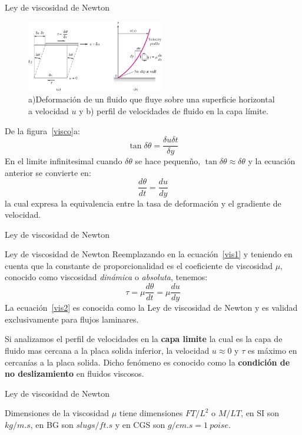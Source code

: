 \documentclass [xcolor=svgnames, t] {beamer}
\begin{document}
\begin{frame}{Ley de viscosidad de Newton}
\small
\vspace{-0.4cm}
\begin{figure}[h]
\centering
\includegraphics[width=6cm]{visco}
\caption{a)Deformaci\'on de un fluido que fluye sobre una superficie horizontal a velocidad $u$ y  b) perfil de velocidades de fluido en la capa l\'imite.}
\end{figure}
\vspace{-0.4cm}
De la figura~\ref{visco}a:
$$
\tan \delta \theta = \frac{\delta u \delta t}{\delta y}
$$
En el limite infinitesimal cuando $\delta \theta$ se hace pequen\~no, $\tan \delta \theta \approx \delta \theta$ y la ecuaci\'on anterior se convierte en:
$$
\frac{d\theta}{dt}=\frac{du}{dy}
$$
la cual expresa la equivalencia entre la tasa de deformaci\'on y el gradiente de velocidad.

\end{frame}

\begin{frame}{Ley de viscosidad de Newton}
\begin{block}{Ley de viscosidad de Newton}
Reemplazando en la ecuaci\'on~\ref{vis1} y teniendo en cuenta que la constante de proporcionalidad es el coeficiente de viscosidad $\mu$, conocido como viscosidad \emph{din\'amica} o \emph{absoluta}, tenemos:
\begin{equation}
\tau = \mu \frac{d \theta}{d t} = \mu \frac{d u}{d y}
\label{vis2}
\end{equation}
La ecuaci\'on~\ref{vis2} es conocida como la Ley de viscosidad de Newton y es validad exclusivamente para flujos laminares.
\end{block}
Si analizamos el perfil de velocidades en la \textbf{capa limite} la cual es la capa de fluido mas cercana a la placa solida inferior, la velocidad $u \approx 0$ y $\tau$ es m\'aximo en cercan\'ias a la placa solida. Dicho fen\'omeno es conocido como la \textbf{condici\'on de no deslizamiento} en fluidos viscosos. 

\end{frame}

\begin{frame}{Ley de viscosidad de Newton}
\begin{block}{Dimensiones de la viscosidad}
$\mu$ tiene dimensiones ${FT/L^2}$ o ${M/LT}$, en SI son $kg/m.s$, en BG son $slugs/ft.s$ y en CGS son $g/cm.s = 1\ poise$. 
\end{block}
\end{frame}
\end{document}
